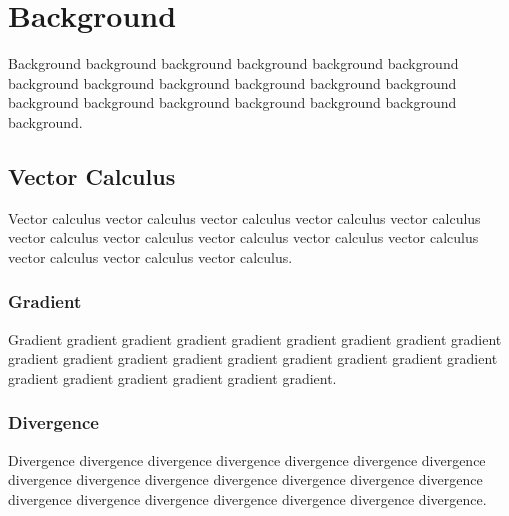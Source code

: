 \chapter{Background}

Background background background background background background background
background background background background background background background
background background background background background.

\section{Vector Calculus}

Vector calculus vector calculus vector calculus vector calculus vector
calculus vector calculus vector calculus vector calculus vector calculus
vector calculus vector calculus vector calculus vector calculus.

\subsection{Gradient}

Gradient gradient gradient gradient gradient gradient gradient gradient
gradient gradient gradient gradient gradient gradient gradient gradient
gradient gradient gradient gradient gradient gradient gradient gradient.

\subsection{Divergence}

Divergence divergence divergence divergence divergence divergence divergence
divergence divergence divergence divergence divergence divergence divergence
divergence divergence divergence divergence divergence divergence divergence.

